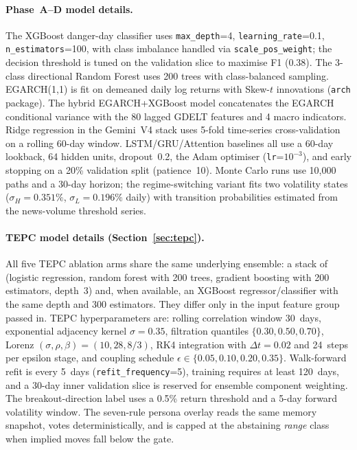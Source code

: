 \documentclass[11pt]{article}
\begin{document}
\paragraph{Phase~A--D model details.}
The XGBoost danger-day classifier uses \texttt{max\_depth}=4, \texttt{learning\_rate}=0.1, \texttt{n\_estimators}=100, with class imbalance handled via \texttt{scale\_pos\_weight}; the decision threshold is tuned on the validation slice to maximise F1 (0.38). The 3-class directional Random Forest uses 200 trees with class-balanced sampling. EGARCH(1,1) is fit on demeaned daily log returns with Skew-$t$ innovations (\texttt{arch} package). The hybrid EGARCH+XGBoost model concatenates the EGARCH conditional variance with the 80 lagged GDELT features and 4 macro indicators. Ridge regression in the Gemini~V4 stack uses 5-fold time-series cross-validation on a rolling 60-day window. LSTM/GRU/Attention baselines all use a 60-day lookback, 64 hidden units, dropout~0.2, the Adam optimiser (\texttt{lr}=$10^{-3}$), and early stopping on a 20\% validation split (patience~10). Monte Carlo runs use 10{,}000 paths and a 30-day horizon; the regime-switching variant fits two volatility states ($\sigma_H{=}0.351\%$, $\sigma_L{=}0.196\%$ daily) with transition probabilities estimated from the news-volume threshold series.

\paragraph{TEPC model details (Section~\ref{sec:tepc}).}
All five TEPC ablation arms share the same underlying ensemble: a stack of (logistic regression, random forest with 200 trees, gradient boosting with 200 estimators, depth~3) and, when available, an XGBoost regressor/classifier with the same depth and 300 estimators. They differ only in the input feature group passed in. TEPC hyperparameters are: rolling correlation window 30~days, exponential adjacency kernel $\sigma=0.35$, filtration quantiles $\{0.30,0.50,0.70\}$, Lorenz $(\sigma,\rho,\beta)=(10,28,8/3)$, RK4 integration with $\Delta t=0.02$ and 24~steps per epsilon stage, and coupling schedule $\epsilon\in\{0.05,0.10,0.20,0.35\}$. Walk-forward refit is every 5~days (\texttt{refit\_frequency}=5), training requires at least 120~days, and a 30-day inner validation slice is reserved for ensemble component weighting. The breakout-direction label uses a 0.5\% return threshold and a 5-day forward volatility window. The seven-rule persona overlay reads the same memory snapshot, votes deterministically, and is capped at the abstaining \emph{range} class when implied moves fall below the gate.
\end{document}
